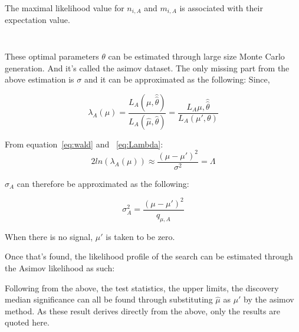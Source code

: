 The maximal likelihood value for $n_{i,A}$ and $m_{i,A}$ is associated with their expectation value. 

\begin{equation}
\end{equation}

\begin{equation}
\end{equation}


These optimal parameters $\theta$ can be estimated through large size Monte Carlo generation. And it's called the asimov dataset.
The only missing part from the above estimation is $\sigma$ and it can be approximated as the following: 
Since, 

\begin{equation}
    \lambda_{A}(\mu) = \frac{L_{A}(\mu, \hat{\hat{\theta}})}{L_{A}(\hat{\mu}, \hat{\theta})}
= \frac{L_{A}{\mu, \hat{\hat{\theta}}}}{L_{A}(\mu', \theta)}
\end{equation}


From equation~\ref{eq:wald} and ~\ref{eq:Lambda}:
\begin{equation}
2ln(\lambda_{A}(\mu)) \approx \frac{(\mu-\mu')^{2}}{\sigma^{2}}=\Lambda
\end{equation}

$\sigma_{A}$ can therefore be approximated as the following:

\begin{equation}
    \sigma_{A}^{2} = \frac{(\mu-\mu')^{2}}{q_{\mu,A}}
\end{equation}

When there is no signal, $\mu'$ is taken to be zero. 


Once that's found, the likelihood profile of the search can be estimated through the Asimov likelihood as such:

Following from the above, the test statistics, the upper limits, the discovery median significance can all be found through substituting $\hat{\mu}$ as $\mu'$ by the asimov method. As these result derives directly from the above, only the results are quoted here. 

